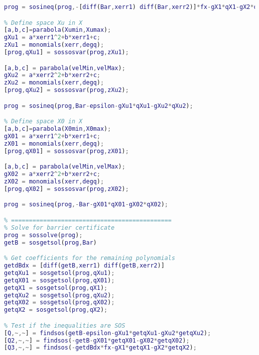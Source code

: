 \begin{lstlisting}[language=matlab]
prog = sosineq(prog,-[diff(Bar,xerr1) diff(Bar,xerr2)]*fx-gX1*qX1-gX2*qX2);

% Define space Xu in X
[a,b,c]=parabola(Xumin,Xumax);
gXu1 = a*xerr1^2+b*xerr1+c;
zXu1 = monomials(xerr,degq);
[prog,qXu1] = sossosvar(prog,zXu1);

[a,b,c] = parabola(velMin,velMax);
gXu2 = a*xerr2^2+b*xerr2+c;
zXu2 = monomials(xerr,degq);
[prog,qXu2] = sossosvar(prog,zXu2);

prog = sosineq(prog,Bar-epsilon-gXu1*qXu1-gXu2*qXu2);

% Define space X0 in X
[a,b,c]=parabola(X0min,X0max);
gX01 = a*xerr1^2+b*xerr1+c;
zX01 = monomials(xerr,degq);
[prog,qX01] = sossosvar(prog,zX01);

[a,b,c] = parabola(velMin,velMax);
gX02 = a*xerr2^2+b*xerr2+c;
zX02 = monomials(xerr,degq);
[prog,qX02] = sossosvar(prog,zX02);

prog = sosineq(prog,-Bar-gX01*qX01-gX02*qX02);

% =============================================
% Solve for barrier certificate
prog = sossolve(prog);
getB = sosgetsol(prog,Bar)

% Get coefficients for the remaining polynomials
getdBdx = [diff(getB,xerr1) diff(getB,xerr2)]
getqXu1 = sosgetsol(prog,qXu1);
getqX01 = sosgetsol(prog,qX01);
getqX1 = sosgetsol(prog,qX1);
getqXu2 = sosgetsol(prog,qXu2);
getqX02 = sosgetsol(prog,qX02);
getqX2 = sosgetsol(prog,qX2);

% Test if the inequalities are SOS
[Q,~,~] = findsos(getB-epsilon-gXu1*getqXu1-gXu2*getqXu2);
[Q2,~,~] = findsos(-getB-gX01*getqX01-gX02*getqX02);
[Q3,~,~] = findsos(-getdBdx*fx-gX1*getqX1-gX2*getqX2);
\end{lstlisting}